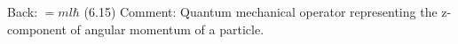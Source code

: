\documentclass{article}
\begin{document}
\pagecolor{white} %
\centering
 Back: \( = ml\hbar \) (6.15)  Comment: Quantum mechanical operator representing the z-component of angular momentum of a particle.
\end{document}
